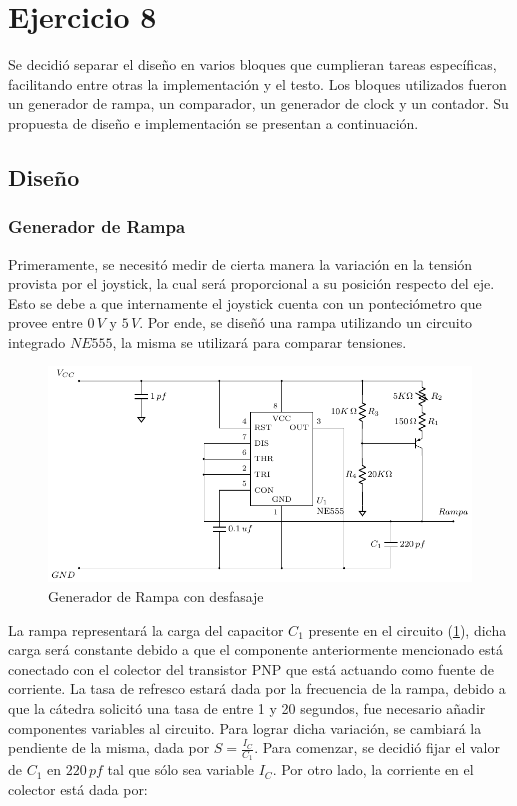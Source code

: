 \section{Ejercicio 8}
Se decidió separar el diseño en varios bloques que cumplieran tareas específicas, facilitando entre otras la implementación y el testo. Los bloques utilizados fueron un generador de rampa, un comparador, un generador de clock y un contador. Su propuesta de diseño e implementación se presentan a continuación. \par

\subsection{Diseño}

\subsubsection{Generador de Rampa}

Primeramente, se necesitó medir de cierta manera la variación en la tensión provista por el joystick, la cual será proporcional a su posición respecto del eje. Esto se debe a que internamente el joystick cuenta con un ponteciómetro que provee entre $0\,V$ y $5\,V$. Por ende, se diseñó una rampa utilizando un circuito integrado $NE555$, la misma se utilizará para comparar tensiones. \par

\begin{figure}[H]
\centering
\includegraphics[scale=0.8]{Ejercicio8/Circuitos/Generador_de_rampa.pdf}
\caption{Generador de Rampa con desfasaje}
\label{fig:Generador_de_rampa}
\end{figure}

La rampa representará la carga del capacitor $C_1$ presente en el circuito (\ref{fig:Generador_de_rampa}), dicha carga será constante debido a que el componente anteriormente mencionado está conectado con el colector del transistor PNP que está actuando como fuente de corriente. La tasa de refresco estará dada por la frecuencia de la rampa, debido a que la cátedra solicitó una tasa de entre 1 y 20 segundos, fue necesario añadir componentes variables al circuito. Para lograr dicha variación, se cambiará la pendiente de la misma, dada por $S=\frac{I_C}{C_1}$. Para comenzar, se decidió fijar el valor de $C_1$ en $220\,pf$ tal que sólo sea variable $I_C$. Por otro lado, la corriente en el colector está dada por:

